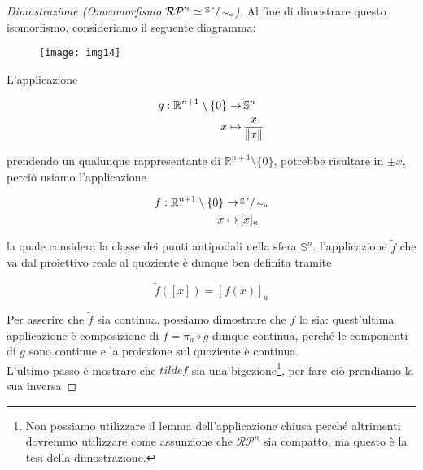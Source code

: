 \begin{proof}[Dimostrazione (Omeomorfismo $ \mathcal{RP}^{n} \simeq \sfrac{\mathbb{S}^{n}}{\sim_{a}} $)]
	Al fine di dimostrare questo isomorfismo, consideriamo il seguente diagramma:
	
	\begin{figure}[H]
		\centering
		\texttt{[image: img14]}
	\end{figure}

	L'applicazione
	
	\begin{align}
		\begin{split}
			g : \mathbb{R}^{n+1} \setminus \{0\} \to& \, \mathbb{S}^{n}\\
			x \mapsto& \, \dfrac{x}{\norm{x}}
		\end{split}
	\end{align}

	prendendo un qualunque rappresentante di $ \mathbb{R}^{n+1} \setminus \{0\} $, potrebbe risultare in $ \pm x $, perciò usiamo l'applicazione
	
	\begin{align}
		\begin{split}
			f : \mathbb{R}^{n+1} \setminus \{0\} \to& \, \sfrac{\mathbb{S}^{n}}{\sim_{a}}\\
			x \mapsto& \, [x]_{a}
		\end{split}
	\end{align}

	la quale considera la classe dei punti antipodali nella sfera $ \mathbb{S}^{n} $. l'applicazione $ \tilde{f} $ che va dal proiettivo reale al quoziente è dunque ben definita tramite
	
	\begin{equation}
		\tilde{f}([x]) = [f(x)]_{a}
	\end{equation}

	Per asserire che $ \tilde{f} $ sia continua, possiamo dimostrare che $ f $ lo sia: quest'ultima applicazione è composizione di $ f = \pi_{a} \circ g $ dunque continua, perché le componenti di $ g $ sono continue e la proiezione sul quoziente è continua.\\
	L'ultimo passo è mostrare che $ tilde{f} $ sia una bigezione\footnote{%
		Non possiamo utilizzare il lemma dell'applicazione chiusa perché altrimenti dovremmo utilizzare come assunzione che $ \mathcal{RP}^{n} $ sia compatto, ma questo è la tesi della dimostrazione.%
	}, per fare ciò prendiamo la sua inversa


\end{proof}
